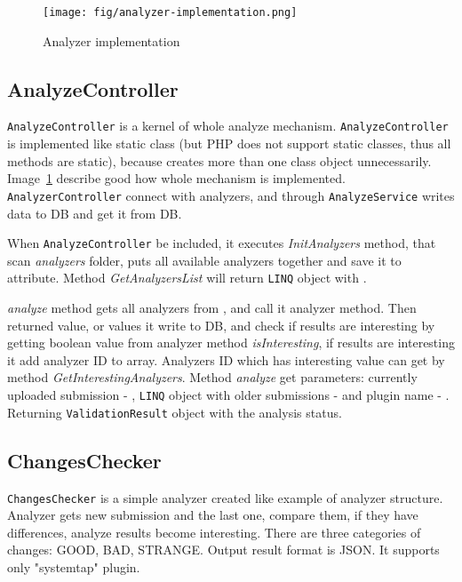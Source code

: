 \begin{figure}
  \centering
    \texttt{[image: fig/analyzer-implementation.png]}
  \caption{Analyzer implementation}
  \label{fig:an_impl}
\end{figure}

\subsection{AnalyzeController}

\texttt{AnalyzeController} is a kernel of whole analyze mechanism. \texttt{AnalyzeController} is implemented like static class (but PHP does not support static classes, thus all methods are static), because creates more than one class object unnecessarily. Image\ \ref{fig:an_impl} describe good how whole mechanism is implemented. \texttt{AnalyzerController} connect with analyzers, and through \texttt{AnalyzeService} writes data to DB and get it from DB.

When \texttt{AnalyzeController} be included, it executes \emph{InitAnalyzers} method, that scan \emph{analyzers} folder, puts all available analyzers together and save it to \emph{} attribute. Method \emph{GetAnalyzersList} will return \texttt{LINQ} object with \emph{}.

\emph{analyze} method gets all analyzers from \emph{}, and call it analyzer method. Then returned value, or values it write to DB, and check if results are interesting by getting boolean value from analyzer method \emph{isInteresting}, if results are interesting it add analyzer ID to \emph{} array. Analyzers ID which has interesting value can get by method \emph{GetInterestingAnalyzers}. Method \emph{analyze} get parameters: currently uploaded submission - \emph{}, \texttt{LINQ} object with older submissions - \emph{} and plugin name - \emph{}. Returning \texttt{ValidationResult} object with the analysis status.

\subsection{ChangesChecker}

\texttt{ChangesChecker} is a simple analyzer created like example of analyzer structure. Analyzer gets new submission and the last one, compare them, if they have differences, analyze results become interesting. There are three categories of changes: GOOD, BAD, STRANGE. Output result format is JSON. It supports only "systemtap" plugin.

